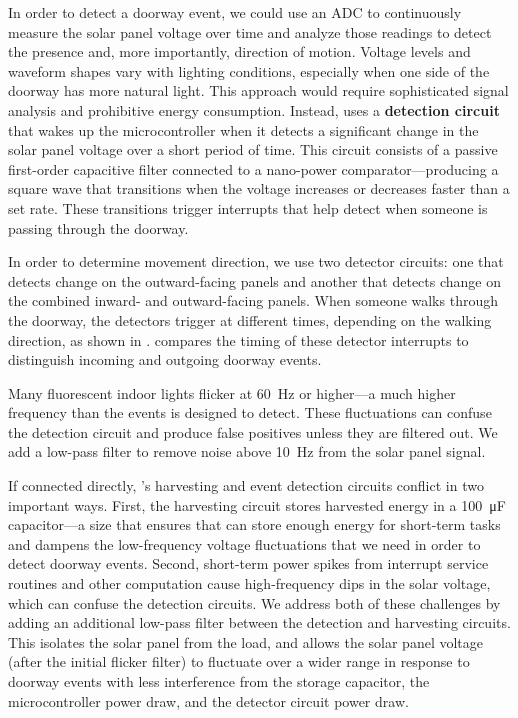 In order to detect a doorway event, we could use an ADC to continuously measure the solar panel voltage over time and analyze those readings to detect the presence and, more importantly, direction of motion.
Voltage levels and waveform shapes vary with lighting conditions, especially when one side of the doorway has more natural light.
This approach would require sophisticated signal analysis and prohibitive energy consumption.
Instead, \sysname uses a \textbf{detection circuit} that wakes up the microcontroller when it detects a significant change in the solar panel voltage over a short period of time.
This circuit consists of a passive first-order capacitive filter connected to a nano-power comparator---producing a square wave that transitions when the voltage increases or decreases faster than a set rate.
These transitions trigger interrupts that help \sysname detect when someone is passing through the doorway.

In order to determine movement direction, we use two detector circuits: one that detects change on the outward-facing panels and another that detects change on the combined inward- and outward-facing panels.
When someone walks through the doorway, the detectors trigger at different times, depending on the walking direction, as shown in .
\sysname compares the timing of these detector interrupts to distinguish incoming and outgoing doorway events.


Many fluorescent indoor lights flicker at \SI{60}{\hertz} or higher---a much higher frequency than the events \sysname is designed to detect.
These fluctuations can confuse the detection circuit and produce false positives unless they are filtered out.
We add a low-pass filter to remove noise above \SI{10}{\hertz} from the solar panel signal.

If connected directly, \sysname's harvesting and event detection circuits conflict in two important ways.
First, the harvesting circuit stores harvested energy in a \SI{100}{\micro\farad} capacitor---a size that ensures that \sysname can store enough energy for short-term tasks and dampens the low-frequency voltage fluctuations that we need in order to detect doorway events.
Second, short-term power spikes from interrupt service routines and other computation cause high-frequency dips in the solar voltage, which can confuse the detection circuits.
We address both of these challenges by adding an additional low-pass filter between the detection and harvesting circuits. This isolates the solar panel from the load, and allows the solar panel voltage (after the initial flicker filter) to fluctuate over a wider range in response to doorway events with less interference from the storage capacitor, the microcontroller power draw, and the detector circuit power draw.


